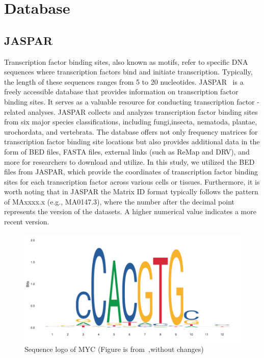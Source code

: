 \documentclass{PHlab-thesis}
\begin{document}
\section{Database}
\subsection{JASPAR}
Transcription factor binding sites, also known as motifs, refer to specific DNA sequences where transcription factors bind and initiate transcription. Typically, the length of these sequences ranges from 5 to 20 nucleotides. JASPAR~\cite{10.1093/nar/gkab1113} is a freely accessible database that provides information on transcription factor binding sites. It serves as a valuable resource for conducting transcription factor - related analyses. JASPAR collects and analyzes transcription factor binding sites from six major species classifications, including fungi,insecta, nematoda, plantae, urochordata, and vertebrata. The database offers not only frequency matrices for transcription factor binding site locations but also provides additional data in the form of BED files, FASTA files, external links (such as ReMap and DRV), and more for researchers to download and utilize. In this study, we utilized the BED files from JASPAR, which provide the coordinates of transcription factor binding sites for each transcription factor across various cells or tissues. Furthermore, it is worth noting that in JASPAR the Matrix ID format typically follows the pattern of MAxxxx.x (e.g., MA0147.3), where the number after the decimal point represents the version of the datasets. A higher numerical value indicates a more recent version.

\begin{figure}[H]
	\centering
	\includegraphics[scale=0.4]{figures/MA0147.3.png}
	\caption{Sequence logo of MYC (Figure is from~\cite{10.1093/nar/gkab1113},without changes)}
	\label{fig:MA0147} %
\end{figure}
\end{document}
